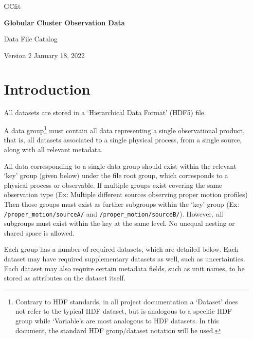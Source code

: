 \documentclass[12pt]{article}
\begin{document}
\begin{titlepage}
       \vspace*{2cm}

       \LARGE
        GCfit

       \vspace{2cm}

       \Huge
       \textbf{Globular Cluster Observation Data}

       \vspace{2cm}
        
        \LARGE
        Data File Catalog

       \vspace{1.5cm}

       \vfill

       Version 2
       January 18, 2022
\end{titlepage}

\section{Introduction}

All datasets are stored in a `Hierarchical Data Format' (HDF5) file.

A data group\footnote{Contrary to HDF standards, in all project documentation a
`Dataset' does not refer to the typical HDF dataset, but is analogous to a
specific HDF group while `Variable's are most analogous to HDF datasets. In this
document, the standard HDF group/dataset notation will be used.} must contain
all data representing a single observational product, that is, all
datasets associated to a single physical process,
from a single source, along with all relevant metadata.

All data corresponding to a single data group should exist within the relevant
`key' group (given below) under the file root group, which corresponds to a
physical process or observable. If multiple groups exist covering the same
observation type (Ex: Multiple different sources observing proper motion
profiles) Then those groups must exist as further subgroups within the `key'
group (Ex: \texttt{/proper\_motion/sourceA/} and
\texttt{/proper\_motion/sourceB/}). However, all subgroups must exist within the
key at the same level. No unequal nesting or shared space is allowed.

Each group has a number of required datasets, which are detailed below. Each
dataset may have required supplementary datasets as well, such as uncertainties.
Each dataset may also require certain metadata fields, such as unit names, to
be stored as attributes on the dataset itself.
\end{document}
